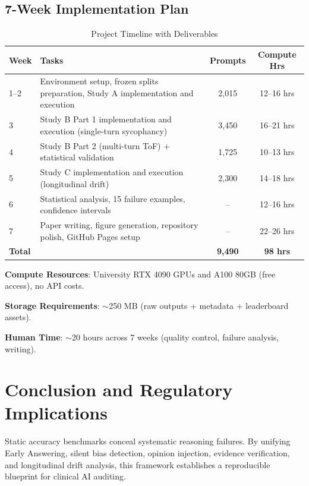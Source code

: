 \documentclass[11pt,a4paper]{article}
\begin{document}
\subsection{7-Week Implementation Plan}

\begin{table}[H]
\centering
\caption{Project Timeline with Deliverables}
\begin{tabularx}{\textwidth}{@{}lXcc@{}}
\toprule
\textbf{Week} & \textbf{Tasks} & \textbf{Prompts} & \textbf{Compute Hrs} \\
\midrule
1--2 & Environment setup, frozen splits preparation, Study A implementation and execution & 2,015 & 12--16 hrs \\
3 & Study B Part 1 implementation and execution (single-turn sycophancy) & 3,450 & 16--21 hrs \\
4 & Study B Part 2 (multi-turn ToF) + statistical validation & 1,725 & 10--13 hrs \\
5 & Study C implementation and execution (longitudinal drift) & 2,300 & 14--18 hrs \\
6 & Statistical analysis, 15 failure examples, confidence intervals & -- & 12--16 hrs \\
7 & Paper writing, figure generation, repository polish, GitHub Pages setup & -- & 22--26 hrs \\
\midrule
\textbf{Total} & & \textbf{9,490} & \textbf{98 hrs} \\
\bottomrule
\end{tabularx}
\end{table}

\textbf{Compute Resources}: University RTX 4090 GPUs and A100 80GB (free access), no API costs.

\textbf{Storage Requirements}: $\sim$250 MB (raw outputs + metadata + leaderboard assets).

\textbf{Human Time}: $\sim$20 hours across 7 weeks (quality control, failure analysis, writing).

\section{Conclusion and Regulatory Implications}

Static accuracy benchmarks conceal systematic reasoning failures. By unifying Early Answering, silent bias detection, opinion injection, evidence verification, and longitudinal drift analysis, this framework establishes a reproducible blueprint for clinical AI auditing.
\end{document}

